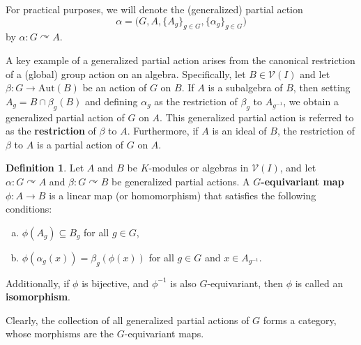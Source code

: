 \documentclass[11pt]{amsart}
\numberwithin{equation}{section}
\theoremstyle{definition}
\newtheorem{definition}[theorem]{Definition}
\theoremstyle{remark}
\begin{document}
For practical purposes, we will denote the (generalized) partial action \[ \alpha = \big( G, A, \{ A_{g} \}_{g \in G}, \{ \alpha_{g} \}_{g \in G} \big) \] by \( \alpha: G \curvearrowright A \).

A key example of a generalized partial action arises from the canonical restriction of a (global) group action on an algebra. Specifically, let \( B \in \mathcal{V}(I) \) and let \( \beta: G \to \mathrm{Aut}(B) \) be an action of \( G \) on \( B \). If \( A \) is a subalgebra of \( B \), then setting \( A_g = B \cap \beta_g(B) \) and defining \( \alpha_g \) as the restriction of \( \beta_g \) to \( A_{g^{-1}} \), we obtain a generalized partial action of \( G \) on \( A \). This generalized partial action is referred to as the \textbf{restriction} of \( \beta \) to \( A \). Furthermore, if \( A \) is an ideal of \( B \), the restriction of \( \beta \) to \( A \) is a partial action of \( G \) on \( A \).

\begin{definition}\label{equivariant map}
    Let \( A \) and \( B \) be \( K \)-modules or algebras in \( \mathcal{V}(I) \), and let \( \alpha: G \curvearrowright A \) and \( \beta: G \curvearrowright B \) be generalized partial actions. A \textbf{\( G \)-equivariant map} \( \phi: A \to B \) is a linear map (or homomorphism) that satisfies the following conditions:
    \begin{enumerate}[a)]
        \item \( \phi(A_g) \subseteq B_g \) for all \( g \in G \),
        \item \( \phi(\alpha_g(x)) = \beta_g(\phi(x)) \) for all \( g \in G \) and \( x \in A_{g^{-1}} \).
    \end{enumerate}
    Additionally, if \(\phi\) is bijective, and \(\phi^{-1}\) is also \(G\)-equivariant, then \(\phi\) is called an \textbf{isomorphism}.
\end{definition}

Clearly, the collection of all generalized partial actions of \( G \) forms a category, whose morphisms are the \( G \)-equivariant maps.

\end{document}
